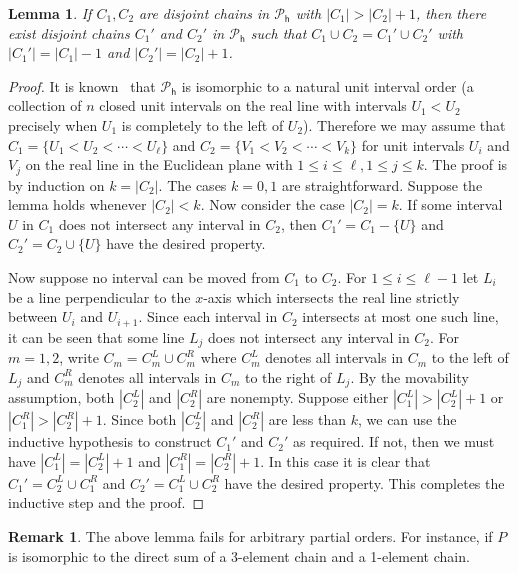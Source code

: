 \documentclass[12pt,a4paper,reqno]{amsart}
\theoremstyle{plain}
\newtheorem{lemma}[theorem]{Lemma}
\theoremstyle{definition}
\newtheorem{remark}[theorem]{Remark}
\newcommand{\1}{\mathds{1}}
\newcommand{\hes}{\mathsf{h}}
\begin{document}
\begin{lemma}\label{lem:exchange}
  If $C_1,C_2$ are disjoint chains in $\mathcal{P}_\hes$ with $|C_1|> |C_2|+1$, then there exist disjoint chains $C_1'$ and $C_2'$ in $\mathcal{P}_\hes$ such that $C_1\cup C_2=C_1'\cup C_2'$ with $|C_1'|=|C_1|-1$ and $|C_2'|=|C_2|+1$.
\end{lemma}
\begin{proof}
It is known~\cite[Proposition 4.1]{Shareshian-Wachs} that $\mathcal{P}_\hes$ is isomorphic to a natural unit interval order (a collection of $n$ closed unit intervals on the real line with intervals $U_1<U_2$ precisely when $U_1$ is completely to the left of $U_2$). Therefore we may assume that $C_1=\{U_1< U_2< \cdots <U_\ell\}$ and $C_2=\{V_1<V_2< \cdots<V_k\}$ for unit intervals $U_i$ and $V_j$ on the real line in the Euclidean plane with $1\leq i\leq \ell, 1\leq j\leq k$.
The proof is by induction on $k=|C_2|$. The cases $k=0,1$ are straightforward. Suppose the lemma holds whenever $|C_2|<k$. Now consider the case $|C_2|=k$.  If some interval $U$ in $C_1$ does not intersect any interval in $C_2$, then $C_1'=C_1-\{U\}$ and $C_2'=C_2\cup\{U\}$ have the desired property.

Now suppose no interval can be moved from $C_1$ to $C_2$. For $1\leq i\leq \ell-1$ let $L_i$ be a line perpendicular to the $x$-axis which intersects the real line strictly between $U_{i}$ and $U_{i+1}$. Since each interval in $C_2$ intersects at most one such line, it can be seen that some line $L_j$ does not intersect any interval in $C_2$. For $m=1,2$, write $C_m=C_m^L\cup C_m^R$ where $C_m^L$ denotes all intervals in $C_m$ to the left of $L_j$ and $C_m^R$ denotes all intervals in $C_m$ to the right of $L_j$. By the movability assumption, both $|C_2^L|$ and $|C_2^R|$ are nonempty. Suppose either $|C_1^L|> |C_2^L|+1$ or $|C_1^R|> |C_2^R|+1$. Since both $|C_2^L|$ and $|C_2^R|$ are less than $k$, we can use the inductive hypothesis to construct $C_1'$ and $C_2'$ as required. If not, then we must have $|C_1^L|= |C_2^L|+1$ and $|C_1^R|= |C_2^R|+1$. In this case it is clear that $C_1'=C_2^L\cup C_1^R$ and $C_2'=C_1^L\cup C_2^R$ have the desired property. This completes the inductive step and the proof.
\end{proof}
\begin{remark}
  The above lemma fails for arbitrary partial orders. For instance, if $P$ is isomorphic to the direct sum of a 3-element chain and a 1-element chain. 
\end{remark}
\end{document}

